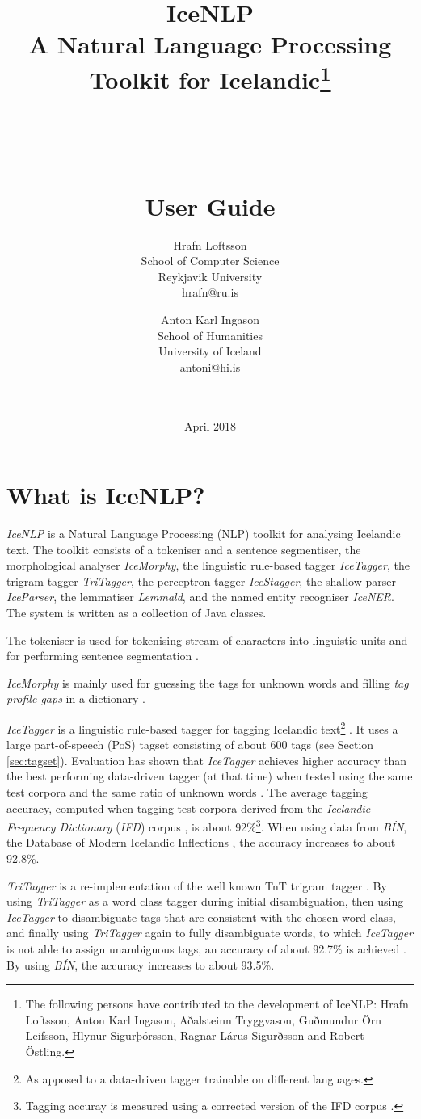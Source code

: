 \documentclass[11pt]{article}
\title{IceNLP \\
A Natural Language Processing Toolkit for Icelandic\footnote{The following persons have contributed to the development of IceNLP: Hrafn Loftsson, Anton Karl Ingason, Aðalsteinn Tryggvason, Guðmundur Örn Leifsson, Hlynur Sigurþórsson, Ragnar Lárus Sigurðsson and Robert Östling.} \\ \ \\ \ \\ \ \\
    User Guide}
\author{Hrafn Loftsson \\
        School of Computer Science \\
        Reykjavik University \\
        hrafn@ru.is 
\and
	Anton Karl Ingason \\
	School of Humanities \\
	University of Iceland \\
	antoni@hi.is \\ \ \\ \ \\
}
\begin{document}
\label{firstpage}
\date{April 2018}
\maketitle
\newpage
\tableofcontents
\newpage

\section{What is IceNLP?}
\emph{IceNLP} is a Natural Language Processing (NLP) toolkit for analysing Icelandic text.
The toolkit consists of a tokeniser and a sentence segmentiser, the morphological analyser \emph{IceMorphy}, the linguistic rule-based tagger \emph{IceTagger}, the trigram tagger \emph{TriTagger}, the perceptron tagger \emph{IceStagger}, the shallow parser \emph{IceParser}, the lemmatiser \emph{Lemmald}, and the named entity recogniser \emph{IceNER}.
The system is written as a collection of Java classes.

The tokeniser is used for tokenising stream of characters into linguistic units and for performing sentence segmentation \citep{pal00}.

\emph{IceMorphy} is mainly used for guessing the tags for unknown words and filling \emph{tag profile gaps} in a dictionary \citep{lof08}.

\emph{IceTagger} is a linguistic rule-based tagger for tagging Icelandic text\footnote{As apposed to a data-driven tagger trainable on different languages.} \citep{lof06,lof08}.
It uses a large part-of-speech (PoS) tagset consisting of about 600 tags (see Section \ref{sec:tagset}).
Evaluation has shown that \textit{IceTagger} achieves higher accuracy than the best performing data-driven tagger (at that time) when tested using the same test corpora and the same ratio of unknown words \citep{lof08,lof09b,lof11,hel04}.
The average tagging accuracy, computed when tagging test corpora derived from the \emph{Icelandic Frequency Dictionary} (\emph{IFD}) corpus \citep{pin91}, is about 92\%\footnote{Tagging accuray is measured using a corrected version of the IFD corpus \citep{lof09}.}.  When using data from \emph{BÍN}, the Database of Modern Icelandic Inflections \citep{kri05}, the accuracy increases to about 92.8\%.

\emph{TriTagger} is a re-implementation of the well known TnT trigram tagger \citep{bra00}.
By using \textit{TriTagger} as a word class tagger during initial disambiguation, then using \textit{IceTagger} to disambiguate tags that are consistent with the chosen word class, 
and finally using \emph{TriTagger} again to fully disambiguate words, to which \emph{IceTagger} is not able to assign unambiguous tags, an accuracy of about 92.7\% is achieved \citep{lof09b,lof11}.  By using \emph{BÍN}, the accuracy increases to about 93.5\%.
\end{document}
